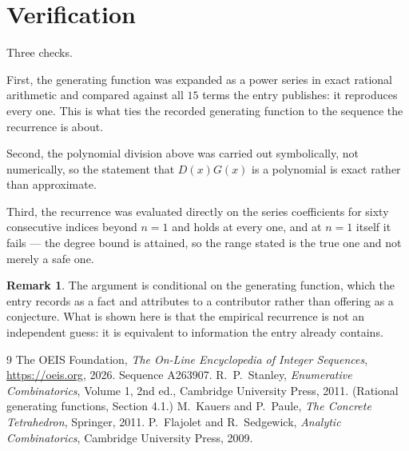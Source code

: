 \documentclass[11pt,a4paper]{article}
\theoremstyle{plain}
\theoremstyle{definition}
\newtheorem{remark}[theorem]{Remark}
\begin{document}
\section{Verification}

Three checks.

First, the generating function was expanded as a power series in exact rational arithmetic and
compared against all $15$ terms the entry publishes: it reproduces every one. This is
what ties the recorded generating function to the sequence the recurrence is about.

Second, the polynomial division above was carried out symbolically, not numerically, so the
statement that $D(x)G(x)$ is a polynomial is exact rather than approximate.

Third, the recurrence was evaluated directly on the series coefficients for sixty consecutive
indices beyond $n=1$ and holds at every one, and at $n=1$ itself it fails --- the
degree bound is attained, so the range stated is the true one and not merely a safe one.

\begin{remark}
The argument is conditional on the generating function, which the entry records as a fact and
attributes to a contributor rather than offering as a conjecture. What is shown here is that
the empirical recurrence is not an independent guess: it is equivalent to information the
entry already contains.
\end{remark}

\begin{thebibliography}{9}
 The OEIS Foundation, \emph{The On-Line Encyclopedia of Integer
Sequences}, \url{https://oeis.org}, 2026. Sequence A263907.
 R.~P.~Stanley, \emph{Enumerative Combinatorics}, Volume 1, 2nd ed.,
Cambridge University Press, 2011. (Rational generating functions, Section 4.1.)
 M.~Kauers and P.~Paule, \emph{The Concrete Tetrahedron}, Springer, 2011.
 P.~Flajolet and R.~Sedgewick, \emph{Analytic Combinatorics}, Cambridge
University Press, 2009.
\end{thebibliography}
\end{document}
